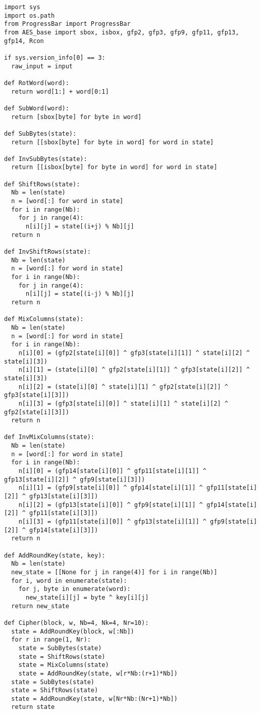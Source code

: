 \begin{lstlisting}
import sys
import os.path
from ProgressBar import ProgressBar
from AES_base import sbox, isbox, gfp2, gfp3, gfp9, gfp11, gfp13, gfp14, Rcon

if sys.version_info[0] == 3:
  raw_input = input

def RotWord(word):
  return word[1:] + word[0:1]

def SubWord(word):
  return [sbox[byte] for byte in word]

def SubBytes(state):
  return [[sbox[byte] for byte in word] for word in state]

def InvSubBytes(state):
  return [[isbox[byte] for byte in word] for word in state]

def ShiftRows(state):
  Nb = len(state)
  n = [word[:] for word in state]
  for i in range(Nb):
    for j in range(4):
      n[i][j] = state[(i+j) % Nb][j]
  return n

def InvShiftRows(state):
  Nb = len(state)
  n = [word[:] for word in state]
  for i in range(Nb):
    for j in range(4):
      n[i][j] = state[(i-j) % Nb][j]
  return n

def MixColumns(state):
  Nb = len(state)
  n = [word[:] for word in state]
  for i in range(Nb):
    n[i][0] = (gfp2[state[i][0]] ^ gfp3[state[i][1]] ^ state[i][2] ^ state[i][3])
    n[i][1] = (state[i][0] ^ gfp2[state[i][1]] ^ gfp3[state[i][2]] ^ state[i][3])
    n[i][2] = (state[i][0] ^ state[i][1] ^ gfp2[state[i][2]] ^ gfp3[state[i][3]])
    n[i][3] = (gfp3[state[i][0]] ^ state[i][1] ^ state[i][2] ^ gfp2[state[i][3]])
  return n

def InvMixColumns(state):
  Nb = len(state)
  n = [word[:] for word in state]
  for i in range(Nb):
    n[i][0] = (gfp14[state[i][0]] ^ gfp11[state[i][1]] ^ gfp13[state[i][2]] ^ gfp9[state[i][3]])
    n[i][1] = (gfp9[state[i][0]] ^ gfp14[state[i][1]] ^ gfp11[state[i][2]] ^ gfp13[state[i][3]])
    n[i][2] = (gfp13[state[i][0]] ^ gfp9[state[i][1]] ^ gfp14[state[i][2]] ^ gfp11[state[i][3]])
    n[i][3] = (gfp11[state[i][0]] ^ gfp13[state[i][1]] ^ gfp9[state[i][2]] ^ gfp14[state[i][3]])
  return n

def AddRoundKey(state, key):
  Nb = len(state)
  new_state = [[None for j in range(4)] for i in range(Nb)]
  for i, word in enumerate(state):
    for j, byte in enumerate(word):
      new_state[i][j] = byte ^ key[i][j]
  return new_state

def Cipher(block, w, Nb=4, Nk=4, Nr=10):
  state = AddRoundKey(block, w[:Nb])
  for r in range(1, Nr):
    state = SubBytes(state)
    state = ShiftRows(state)
    state = MixColumns(state)
    state = AddRoundKey(state, w[r*Nb:(r+1)*Nb])
  state = SubBytes(state)
  state = ShiftRows(state)
  state = AddRoundKey(state, w[Nr*Nb:(Nr+1)*Nb])
  return state


\end{lstlisting}
